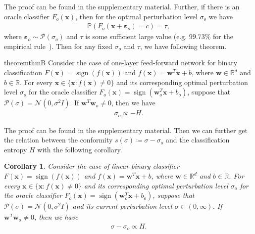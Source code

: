\documentclass[letterpaper]{article} %
\newtheorem{corollary}{Corollary}[theorem]
\begin{document}
The proof can be found in the supplementary material. Further, if there is an oracle classifier $F_o(\mathbf{x})$, then for the optimal perturbation level $\sigma_o$ we have
\begin{align}
\mathbb{P}(F_o(\mathbf{x}+\boldsymbol{\varepsilon}_o) = c) = \tau,
\end{align}
where $\boldsymbol{\varepsilon}_o  \sim \mathcal{P}(\sigma_o)$ and $\tau$ is some sufficient large value (e.g. $99.73\%$ for the empirical rule~\cite{pukelsheim1994three}). Then for any fixed $\sigma_o$ and $\tau$, we have following theorem.

\begin{restatable}[]{theorem}{thmB}
\label{theorem:thmB}
Consider the case of one-layer feed-forward network for binary classification $F(\mathbf{x}) = \operatorname{sign}(f(\mathbf{x}))$ and $f(\mathbf{x}) = \mathbf{w}^T \mathbf{x} + b$, where $\mathbf{w} \in \mathbb{R}^d$ and $b \in \mathbb{R}$.
For every $\mathbf{x} \in \{\mathbf{x}: f(\mathbf{x}) \neq 0\}$ and its corresponding optimal perturbation level $\sigma_o$ for the oracle classifier $F_o(\mathbf{x})=\operatorname{sign}(\mathbf{w}_o^T\mathbf{x}+b_o)$, suppose that $\mathcal{P}(\sigma) = \mathcal{N}(0, \sigma^{2} I)$. If $\mathbf{w}^T \mathbf{w}_o \neq 0$, then we have
\begin{align}
\sigma_o \propto -H.
\end{align}
\end{restatable}
The proof can be found in the supplementary material. Then we can further get the relation between the conformity $s(\sigma) \coloneqq \sigma-\sigma_o$ and the classification entropy $H$ with the following corollary.

\begin{corollary}
\label{corollary:cor1}
Consider the case of linear binary classifier $F(\mathbf{x}) = \operatorname{sign}(f(\mathbf{x}))$ and $f(\mathbf{x}) = \mathbf{w}^T \mathbf{x} + b$, where $\mathbf{w} \in \mathbb{R}^d$ and $b \in \mathbb{R}$.
For every $\mathbf{x} \in \{\mathbf{x}: f(\mathbf{x}) \neq 0\}$ and its corresponding optimal perturbation level $\sigma_o$ for the oracle classifier $F_o(\mathbf{x})=\operatorname{sign}(\mathbf{w}_o^T\mathbf{x}+b_o)$, suppose that $\mathcal{P}(\sigma) = \mathcal{N}(0, \sigma^{2} I)$ and its current perturbation level $\sigma \in (0, \infty)$. If $\mathbf{w}^T \mathbf{w}_o \neq 0$, then we have
\begin{align}
\sigma - \sigma_o \propto H.
\end{align}
\end{corollary}
\end{document}
